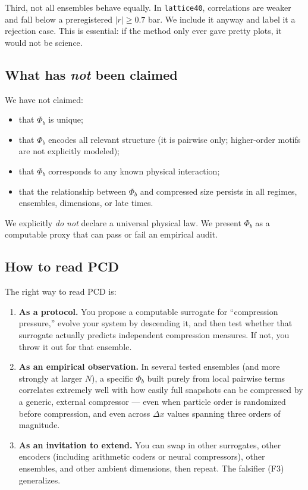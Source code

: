 \documentclass[11pt,a4paper]{article}
\numberwithin{equation}{section}
\newcommand{\phib}{\Phi_b}
\begin{document}
Third, not all ensembles behave equally. In \texttt{lattice40}, correlations are weaker and fall below a preregistered $|r|\ge 0.7$ bar. We include it anyway and label it a rejection case. This is essential: if the method only ever gave pretty plots, it would not be science.

\subsection{What has \emph{not} been claimed}
We have not claimed:
\begin{itemize}
\item that $\phib$ is unique;
\item that $\phib$ encodes all relevant structure (it is pairwise only; higher-order motifs are not explicitly modeled);
\item that $\phib$ corresponds to any known physical interaction;
\item that the relationship between $\phib$ and compressed size persists in all regimes, ensembles, dimensions, or late times.
\end{itemize}

We explicitly \emph{do not} declare a universal physical law. We present $\phib$ as a computable proxy that can pass or fail an empirical audit.

\subsection{How to read PCD}
The right way to read PCD is:
\begin{enumerate}[label=(\alph*)]
\item \textbf{As a protocol.}  
You propose a computable surrogate for ``compression pressure,'' evolve your system by descending it, and then test whether that surrogate actually predicts independent compression measures. If not, you throw it out for that ensemble.

\item \textbf{As an empirical observation.}  
In several tested ensembles (and more strongly at larger $N$), a specific $\phib$ built purely from local pairwise terms correlates extremely well with how easily full snapshots can be compressed by a generic, external compressor --- even when particle order is randomized before compression, and even across $\Delta x$ values spanning three orders of magnitude.

\item \textbf{As an invitation to extend.}  
You can swap in other surrogates, other encoders (including arithmetic coders or neural compressors), other ensembles, and other ambient dimensions, then repeat. The falsifier (F3) generalizes.
\end{enumerate}
\end{document}
